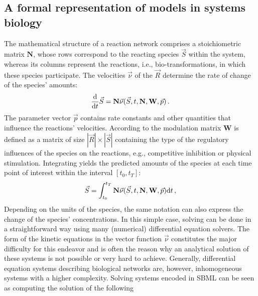 \documentclass[10pt]{bmc_article}
\newenvironment{bmcformat}{\begin{raggedright}\baselineskip20pt\sloppy\setboolean{publ}{false}}{\end{raggedright}\baselineskip20pt\sloppy}
\begin{document}
\begin{bmcformat}
\subsection*{A formal representation of models in systems biology}

The mathematical structure of a reaction network comprises a stoichiometric
matrix $\mathbf{N}$, whose rows correspond to the reacting species $\vec{S}$
within the system, whereas its columns represent the reactions, i.e., bio-transformations,
in which these species participate.
The velocities $\vec{\nu}$ of the  $\vec{R}$ determine the rate of
change of the species' amounts:
\begin{equation}
\frac{\mathrm{d}}{\mathrm{d} t}\vec{S} = \mathbf{N}\vec{\nu}(\vec{S}, t, \mathbf{N}, \mathbf{W}, \vec{p})\,.
\label{eq:SpeciesChange}
\end{equation}
The parameter vector $\vec{p}$ contains rate constants
and other quantities that influence the reactions' velocities.
According to  \cite{Liebermeister2006, Liebermeister2010} the modulation matrix
$\mathbf{W}$ is defined as a matrix of size $|\vec{R}|\times|\vec{S}|$
containing  the type of the regulatory influences of the species on
the reactions, e.g., competitive inhibition or physical stimulation.
Integrating  yields the predicted amounts of the
species at each time point of interest within the interval $[t_0, t_T]$:
\begin{equation}
\vec{S} = \int_{t_0}^{t_T} \mathbf{N}\vec{\nu}(\vec{S}, t, \mathbf{N}, \mathbf{W}, \vec{p})
\mathrm{d} t\,,
\label{eq:SpeciesChangeIntegral}
\end{equation}
Depending on the units of the species, the same notation can also express the
change of the species' concentrations.
In this simple case, solving  can be done in a
straightforward way using many (numerical) differential equation solvers.
The  form of the kinetic equations in the vector function $\vec{\nu}$
constitutes the major difficulty for this endeavor and is often the reason why
an analytical solution of these systems is not possible or very hard to achieve.
Generally, differential equation systems describing biological networks are,
however, inhomogeneous systems with a higher complexity.
Solving systems encoded in \acs{SBML} can be seen as computing the solution of the following

\end{bmcformat}
\end{document}
